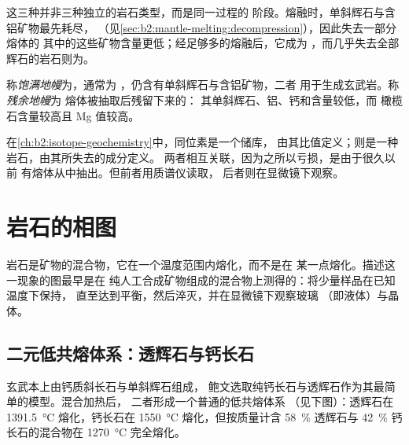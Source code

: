 这三种并非三种独立的岩石类型，而是同一过程的
阶段。熔融时，单斜辉石与含铝矿物最先耗尽，
（见\cref{sec:b2:mantle-melting:decompression}），因此失去一部分熔体的
其中的这些矿物含量更低；经足够多的熔融后，它成为
，而几乎失去全部辉石的岩石则为。

\begin{definition}[饱满地幔与残余地幔]\label{def:b2:mantle-melting:fertility}
称\emph{饱满地幔}为，通常为
，仍含有单斜辉石与含铝矿物，二者
用于生成玄武岩。称\emph{残余地幔}为
熔体被抽取后残留下来的：
其单斜辉石、铝、钙和含量较低，而
橄榄石含量较高且 Mg 值较高。
\end{definition}

在\cref{ch:b2:isotope-geochemistry}中，同位素是一个储库，
由其比值定义；则是一种岩石，由其所失去的成分定义。
两者相互关联，因为之所以亏损，是由于很久以前
有熔体从中抽出。但前者用质谱仪读取，
后者则在显微镜下观察。

\section{岩石的相图}\label{sec:b2:mantle-melting:diagrams}

岩石是矿物的混合物，它在一个温度范围内熔化，而不是在
某一点熔化。描述这一现象的图最早是在
纯人工合成矿物组成的混合物上测得的：将少量样品在已知温度下保持，
直至达到平衡，然后淬灭，并在显微镜下观察玻璃
（即液体）与晶体。

\subsection*{二元低共熔体系：透辉石与钙长石}

玄武本上由钙质斜长石与单斜辉石组成，
鲍文选取纯钙长石与透辉石作为其最简单的模型。混合加热后，
二者形成一个普通的低共熔体系
（见下图）：透辉石在 \qty{1391.5}{\celsius} 熔化，钙长石在
\qty{1550}{\celsius} 熔化，但按质量计含 \qty{58}{\percent} 透辉石与
\qty{42}{\percent} 钙长石的混合物在 \qty{1270}{\celsius} 完全熔化。

